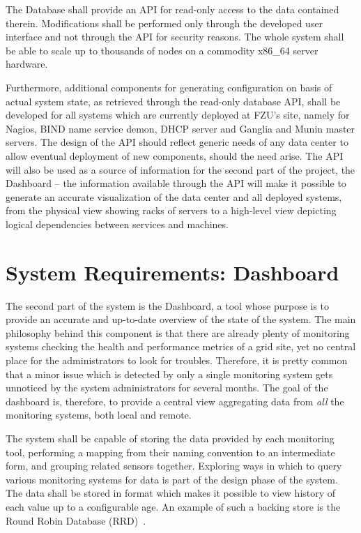 \documentclass[12pt]{article}
\begin{document}
The Database shall provide an API for read-only access to the data contained therein.  Modifications shall be performed only
through the developed user interface and not through the API for security reasons.  The whole system shall be able to scale up to
thousands of nodes on a commodity x86\_64 server hardware.

Furthermore, additional components for generating configuration on basis of actual system state, as retrieved through the
read-only database API, shall be developed for all systems which are currently deployed at FZU's site, namely for Nagios, BIND
name service demon, DHCP server and Ganglia and Munin master servers.  The design of the API should reflect generic needs of any
data center to allow eventual deployment of new components, should the need arise.  The API will also be used as a source of
information for the second part of the project, the Dashboard -- the information available through the API will make it possible
to generate an accurate visualization of the data center and all deployed systems, from the physical view showing racks of servers
to a high-level view depicting logical dependencies between services and machines.

\section{System Requirements: Dashboard}

The second part of the system is the Dashboard, a tool whose purpose is to provide an accurate and up-to-date overview of the
state of the system.  The main philosophy behind this component is that there are already plenty of monitoring systems checking
the health and performance metrics of a grid site, yet no central place for the administrators to look for troubles.  Therefore,
it is pretty common that a minor issue which is detected by only a single monitoring system gets unnoticed by the system
administrators for several months.  The goal of the dashboard is, therefore, to provide a central view aggregating data from {\em
all} the monitoring systems, both local and remote.

The system shall be capable of storing the data provided by each monitoring tool, performing a mapping from their naming
convention to an intermediate form, and grouping related sensors together.  Exploring ways in which to query various monitoring
systems for data is part of the design phase of the system.  The data shall be stored in format which makes it possible to view
history of each value up to a configurable age.  An example of such a backing store is the Round Robin Database (RRD)~\cite{rrd}.
\end{document}
